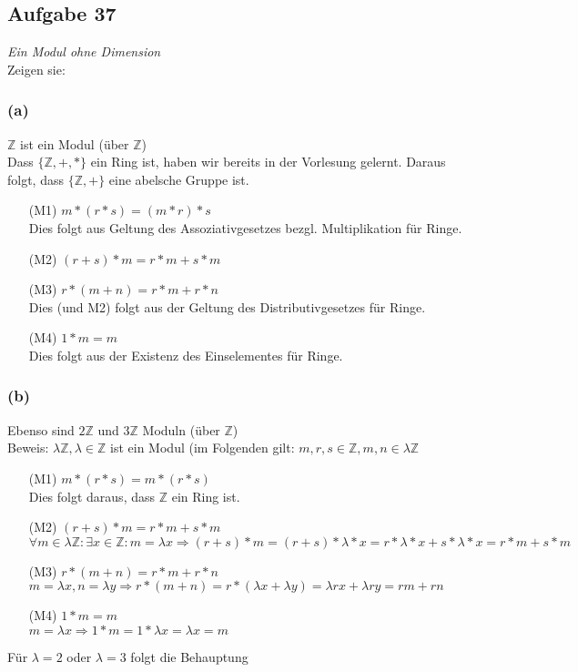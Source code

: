 \documentclass[12pt]{article}
\begin{document}
\subsection*{\textbf{Aufgabe 37}}\textit{Ein Modul ohne Dimension}\\
Zeigen sie:
\subsubsection*{(a)}$\mathbb{Z}$ ist ein Modul ({\"u}ber $\mathbb{Z}$)\\
Dass $\{\mathbb{Z},+,*\}$ ein Ring ist, haben wir bereits in der Vorlesung gelernt. Daraus folgt, dass $\{\mathbb{Z},+\}$ eine abelsche Gruppe ist.
\begin{enumerate}
\item[(M1)] $m*(r*s)=(m*r)*s$\\
Dies folgt aus Geltung des Assoziativgesetzes bezgl. Multiplikation f{\"u}r Ringe.
\item[(M2)] $(r+s)*m=r*m+s*m$
\item[(M3)] $r*(m+n)=r*m+r*n$\\
Dies (und M2) folgt aus der Geltung des Distributivgesetzes f{\"u}r Ringe.
\item[(M4)] $1*m=m$\\
Dies folgt aus der Existenz des Einselementes f{\"u}r Ringe.
\end{enumerate}
\subsubsection*{(b)}Ebenso sind $2\mathbb{Z}$ und $3\mathbb{Z}$ Moduln ({\"u}ber $\mathbb{Z}$)\\
Beweis: $\lambda\mathbb{Z}, \lambda\in\mathbb{Z}$ ist ein Modul (im Folgenden gilt: $m,r,s\in\mathbb{Z}, m,n\in\lambda\mathbb{Z}$
\begin{enumerate}
\item[(M1)]$m*(r*s)=m*(r*s)$\\
Dies folgt daraus, dass $\mathbb{Z}$ ein Ring ist.
\item[(M2)]$(r+s)*m=r*m+s*m$\\
$\forall m \in \lambda\mathbb{Z}: \exists x \in\mathbb{Z}: m={\lambda}x \Rightarrow (r+s)*m=(r+s)*\lambda*x=r*\lambda*x+s*\lambda*x=r*m+s*m$
\item[(M3)]$r*(m+n)=r*m+r*n$\\
$m={\lambda}x, n={\lambda}y \Rightarrow r*(m+n)=r*({\lambda}x+{\lambda}y)={\lambda}rx+{\lambda}ry=rm+rn$
\item[(M4)]$1*m=m$\\
$m={\lambda}x \Rightarrow 1*m=1*{\lambda}x={\lambda}x=m$
\end{enumerate}
F{\"u}r $\lambda=2$ oder $\lambda=3$ folgt die Behauptung
\end{document}
